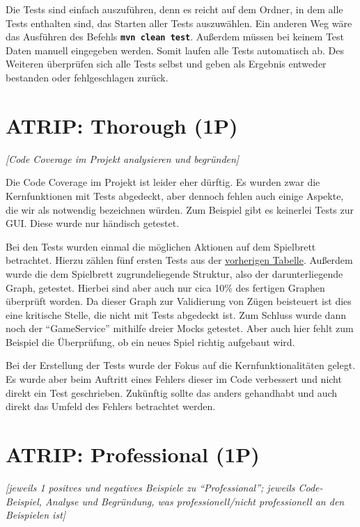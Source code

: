 \noindent Die Tests sind einfach auszuführen, denn es reicht auf dem Ordner, in dem alle Tests enthalten sind, das Starten aller Tests auszuwählen. Ein anderen Weg wäre das Ausführen des Befehls \textbf{\texttt{mvn clean test}}. Außerdem müssen bei keinem Test Daten manuell eingegeben werden. Somit laufen alle Tests automatisch ab. Des Weiteren überprüfen sich alle Tests selbst und geben als Ergebnis entweder bestanden oder fehlgeschlagen zurück.

\newpage
\section{ATRIP: Thorough (1P)}
\emph{[Code Coverage im Projekt analysieren und begründen]}
\vspace{.4cm}

\noindent Die Code Coverage im Projekt ist leider eher dürftig. Es wurden zwar die Kernfunktionen mit Tests abgedeckt, aber dennoch fehlen auch einige Aspekte, die wir als notwendig bezeichnen würden. Zum Beispiel gibt es keinerlei Tests zur GUI. Diese wurde nur händisch getestet.

Bei den Tests wurden einmal die möglichen Aktionen auf dem Spielbrett betrachtet. Hierzu zählen fünf ersten Tests aus der \hyperref[tab:unittesttable]{vorherigen Tabelle}. Außerdem wurde die dem Spielbrett zugrundeliegende Struktur, also der darunterliegende Graph, getestet. Hierbei sind aber auch nur cica 10\% des fertigen Graphen überprüft worden. Da dieser Graph zur Validierung von Zügen beisteuert ist dies eine kritische Stelle, die nicht mit Tests abgedeckt ist. Zum Schluss wurde dann noch der \enquote{GameService} mithilfe dreier Mocks getestet. Aber auch hier fehlt zum Beispiel die Überprüfung, ob ein neues Spiel richtig aufgebaut wird.

Bei der Erstellung der Tests wurde der Fokus auf die Kernfunktionalitäten gelegt. Es wurde aber beim Auftritt eines Fehlers dieser im Code verbessert und nicht direkt ein Test geschrieben. Zukünftig sollte das anders gehandhabt und auch direkt das Umfeld des Fehlers betrachtet werden.

\newpage
\section{ATRIP: Professional (1P)}
\emph{[jeweils 1 positves und negatives Beispiele zu \enquote{Professional}; jeweils Code-Beispiel, Analyse und
Begründung, was professionell/nicht professionell an den Beispielen ist]}

